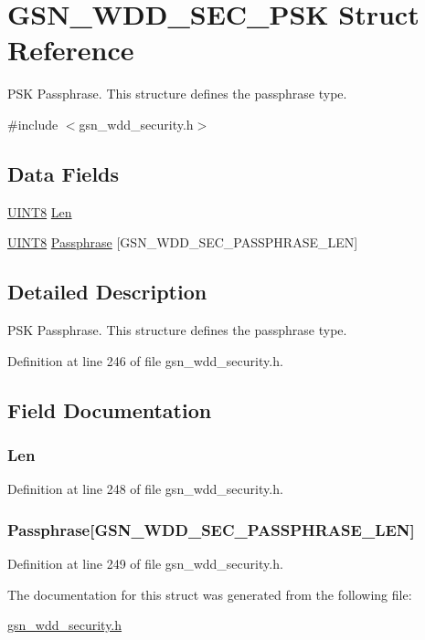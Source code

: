 \hypertarget{a00293}{
\section{GSN\_\-WDD\_\-SEC\_\-PSK Struct Reference}
\label{a00293}
}


PSK Passphrase. This structure defines the passphrase type.  




{\ttfamily \#include $<$gsn\_\-wdd\_\-security.h$>$}

\subsection*{Data Fields}
\begin{DoxyCompactItemize}
\item 
\hyperlink{a00660_gab27e9918b538ce9d8ca692479b375b6a}{UINT8} \hyperlink{a00293_af355beb0e14102e4dd3837c0bd456501}{Len}
\item 
\hyperlink{a00660_gab27e9918b538ce9d8ca692479b375b6a}{UINT8} \hyperlink{a00293_a60dad84418f37ceb56604bb521df0c08}{Passphrase} \mbox{[}GSN\_\-WDD\_\-SEC\_\-PASSPHRASE\_\-LEN\mbox{]}
\end{DoxyCompactItemize}


\subsection{Detailed Description}
PSK Passphrase. This structure defines the passphrase type. 

Definition at line 246 of file gsn\_\-wdd\_\-security.h.



\subsection{Field Documentation}
\hypertarget{a00293_af355beb0e14102e4dd3837c0bd456501}{
\subsubsection[{Len}]{ {\bf Len}}}
\label{a00293_af355beb0e14102e4dd3837c0bd456501}


Definition at line 248 of file gsn\_\-wdd\_\-security.h.

\hypertarget{a00293_a60dad84418f37ceb56604bb521df0c08}{
\subsubsection[{Passphrase}]{ {\bf Passphrase}\mbox{[}GSN\_\-WDD\_\-SEC\_\-PASSPHRASE\_\-LEN\mbox{]}}}
\label{a00293_a60dad84418f37ceb56604bb521df0c08}


Definition at line 249 of file gsn\_\-wdd\_\-security.h.



The documentation for this struct was generated from the following file:\begin{DoxyCompactItemize}
\item 
\hyperlink{a00604}{gsn\_\-wdd\_\-security.h}\end{DoxyCompactItemize}

